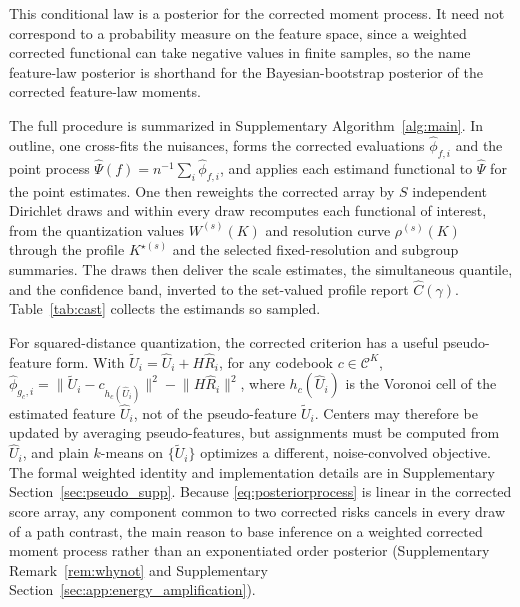 \documentclass[11pt]{article}
\newcommand{\calC}{\mathcal C}
\newcommand{\hU}{\widehat U}
\newcommand{\tU}{\widetilde U}
\newcommand{\hR}{\widehat R}
\newcommand{\hPsi}{\widehat\Psi}
\newcommand{\hphi}{\widehat\phi}
\begin{document}
This conditional law is a posterior for the corrected moment process. It need not correspond to a probability measure on the feature space, since a weighted corrected functional can take negative values in finite samples, so the name feature-law posterior is shorthand for the Bayesian-bootstrap posterior of the corrected feature-law moments.

The full procedure is summarized in Supplementary Algorithm~\ref{alg:main}. In outline, one cross-fits the nuisances, forms the corrected evaluations $\hphi_{f,i}$ and the point process $\hPsi(f)=n^{-1}\sum_i\hphi_{f,i}$, and applies each estimand functional to $\hPsi$ for the point estimates. One then reweights the corrected array by $S$ independent Dirichlet draws and within every draw recomputes each functional of interest, from the quantization values $W^{(s)}(K)$ and resolution curve $\rho^{(s)}(K)$ through the profile $K^{\star(s)}$ and the selected fixed-resolution and subgroup summaries. The draws then deliver the scale estimates, the simultaneous quantile, and the confidence band, inverted to the set-valued profile report $\widehat C(\gamma)$. Table~\ref{tab:cast} collects the estimands so sampled.


For squared-distance quantization, the corrected criterion has a useful pseudo-feature form. With $\tU_i=\hU_i+H\hR_i$, for any codebook $c\in\calC^K$, $\hphi_{g_c,i} = \bigl\|\tU_i-c_{h_c(\hU_i)}\bigr\|^2 - \bigl\|H\hR_i\bigr\|^2$, where $h_c(\hU_i)$ is the Voronoi cell of the estimated feature $\hU_i$, not of the pseudo-feature $\tU_i$. Centers may therefore be updated by averaging pseudo-features, but assignments must be computed from $\hU_i$, and plain $k$-means on $\{\tU_i\}$ optimizes a different, noise-convolved objective. The formal weighted identity and implementation details are in Supplementary Section~\ref{sec:pseudo_supp}. Because \eqref{eq:posteriorprocess} is linear in the corrected score array, any component common to two corrected risks cancels in every draw of a path contrast, the main reason to base inference on a weighted corrected moment process rather than an exponentiated order posterior (Supplementary Remark~\ref{rem:whynot} and Supplementary Section~\ref{sec:app:energy_amplification}).
\end{document}
